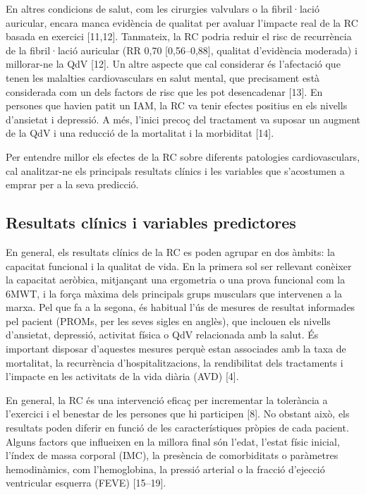\documentclass[CAT]{TFUOC}%
\begin{document}
En altres condicions de salut, com les cirurgies valvulars o la fibril·lació auricular, encara manca evidència de qualitat per avaluar l'impacte real de la RC basada en exercici {[}11,12{]}. Tanmateix, la RC podria reduir el risc de recurrència de la fibril·lació auricular (RR 0,70 {[}0,56--0,88{]}, qualitat d'evidència moderada) i millorar-ne la QdV {[}12{]}. Un altre aspecte que cal considerar és l'afectació que tenen les malalties cardiovasculars en salut mental, que precisament està considerada com un dels factors de risc que les pot desencadenar {[}13{]}. En persones que havien patit un IAM, la RC va tenir efectes positius en els nivells d'ansietat i depressió. A més, l'inici precoç del tractament va suposar un augment de la QdV i una reducció de la mortalitat i la morbiditat {[}14{]}.

Per entendre millor els efectes de la RC sobre diferents patologies cardiovasculars, cal analitzar-ne els principals resultats clínics i les variables que s'acostumen a emprar per a la seva predicció.

\subsection{Resultats clínics i variables predictores}\label{resultats-cluxednics-i-variables-predictores}

En general, els resultats clínics de la RC es poden agrupar en dos àmbits: la capacitat funcional i la qualitat de vida. En la primera sol ser rellevant conèixer la capacitat aeròbica, mitjançant una ergometria o una prova funcional com la 6MWT, i la força màxima dels principals grups musculars que intervenen a la marxa. Pel que fa a la segona, és habitual l'ús de mesures de resultat informades pel pacient (PROMs, per les seves sigles en anglès), que inclouen els nivells d'ansietat, depressió, activitat física o QdV relacionada amb la salut. És important disposar d'aquestes mesures perquè estan associades amb la taxa de mortalitat, la recurrència d'hospitalitzacions, la rendibilitat dels tractaments i l'impacte en les activitats de la vida diària (AVD) {[}4{]}.

En general, la RC és una intervenció eficaç per incrementar la tolerància a l'exercici i el benestar de les persones que hi participen {[}8{]}. No obstant això, els resultats poden diferir en funció de les característiques pròpies de cada pacient. Alguns factors que influeixen en la millora final són l'edat, l'estat físic inicial, l'índex de massa corporal (IMC), la presència de comorbiditats o paràmetres hemodinàmics, com l'hemoglobina, la pressió arterial o la fracció d'ejecció ventricular esquerra (FEVE) {[}15--19{]}.
\end{document}
